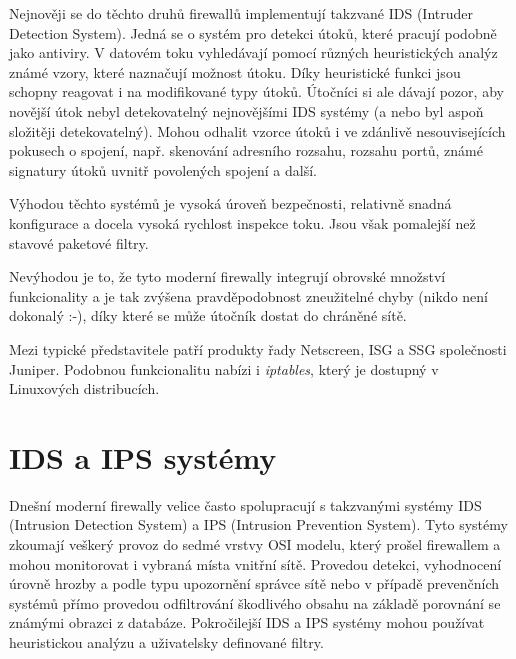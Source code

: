 \documentclass[11pt,a4paper]{article}
\begin{document}
Nejnověji se do  těchto druhů firewallů implementují takzvané IDS (Intruder Detection System). Jedná se o systém pro detekci útoků, které pracují podobně jako antiviry. V datovém toku vyhledávají pomocí různých heuristických analýz známé vzory, které naznačují možnost útoku. Díky heuristické funkci jsou schopny reagovat i na modifikované typy útoků. Útočníci si ale dávají pozor, aby novější útok nebyl detekovatelný nejnovějšími IDS systémy (a nebo byl aspoň složitěji detekovatelný). Mohou odhalit vzorce útoků i ve zdánlivě nesouvisejících pokusech o spojení, např. skenování adresního rozsahu, rozsahu portů, známé signatury útoků uvnitř povolených spojení a další.

Výhodou těchto systémů je vysoká úroveň bezpečnosti, relativně snadná konfigurace a docela vysoká rychlost inspekce toku. Jsou však pomalejší než stavové paketové filtry.

Nevýhodou je to, že tyto moderní firewally integrují obrovské množství funkcionality a je tak zvýšena pravděpodobnost zneužitelné chyby (nikdo není dokonalý :-), díky které se může útočník dostat do chráněné sítě.

Mezi typické představitele patří produkty řady Netscreen, ISG a SSG společnosti Juniper. Podobnou funkcionalitu nabízi i \textit{iptables}, který je dostupný v Linuxových distribucích. 

\section{IDS a IPS systémy}
Dnešní moderní firewally velice často spolupracují s takzvanými systémy IDS (Intrusion Detection System) a IPS (Intrusion Prevention System). Tyto systémy zkoumají veškerý provoz do sedmé vrstvy OSI modelu, který prošel firewallem a mohou monitorovat i vybraná místa vnitřní sítě. Provedou detekci, vyhodnocení úrovně hrozby a podle typu upozornění správce sítě nebo v případě prevenčních systémů přímo provedou odfiltrování škodlivého obsahu na základě porovnání se známými obrazci z databáze. Pokročilejší IDS a IPS systémy mohou používat heuristickou analýzu a uživatelsky definované filtry. 
\end{document}
